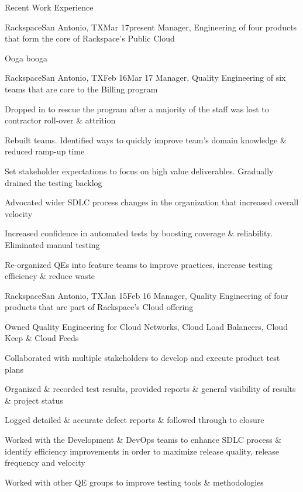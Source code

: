 \documentclass{resume} %
\begin{document}
\begin{rSection}{Recent Work Experience}

\begin{rSubsection}{Rackspace}{San Antonio, TX}{Mar 17}{present}
{Manager, Engineering of four products that form the core of Rackspace's Public Cloud}
  
\item Ooga booga
  
\end{rSubsection}
  
\begin{rSubsection}{Rackspace}{San Antonio, TX}{Feb 16}{Mar 17}
{Manager, Quality Engineering of six teams that are core to the Billing program}
  
\item Dropped in to rescue the program after a majority of the staff was lost to contractor roll-over \& attrition
\item Rebuilt teams. Identified ways to quickly improve team's domain knowledge \& reduced ramp-up time
\item Set stakeholder expectations to focus on high value deliverables. Gradually drained the testing backlog
\item Advocated wider SDLC process changes in the organization that increased overall velocity
\item Increased confidence in automated tests by boosting coverage \& reliability. Eliminated manual testing
\item Re-organized QEs into feature teams to improve practices, increase testing efficiency \& reduce waste
  
\end{rSubsection}
    
\begin{rSubsection}{Rackspace}{San Antonio, TX}{Jan 15}{Feb 16}
{Manager, Quality Engineering of four products that are part of Rackspace's Cloud offering}

\item Owned Quality Engineering for Cloud Networks, Cloud Load Balancers, Cloud Keep \& Cloud Feeds
\item Collaborated with multiple stakeholders to develop and execute product test plans
\item Organized \& recorded test results, provided reports \& general visibility of results \& project status
\item Logged detailed \& accurate defect reports \& followed through to closure
\item Worked with the Development \& DevOps teams to enhance SDLC process \& identify efficiency improvements in order to maximize release quality, release frequency and velocity
\item Worked with other QE groups to improve testing tools \& methodologies


\end{rSubsection}
\end{rSection}
\end{document}
